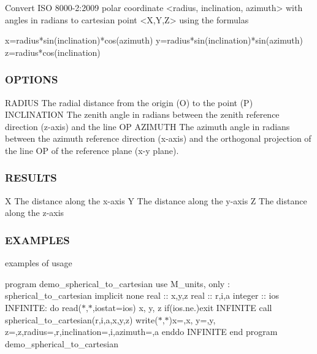 \begin{DoxyVerb} Convert ISO 8000-2:2009 polar coordinate <radius, inclination, azimuth> with
 angles in radians to cartesian point <X,Y,Z> using the formulas

   x=radius*sin(inclination)*cos(azimuth)
   y=radius*sin(inclination)*sin(azimuth)
   z=radius*cos(inclination)
\end{DoxyVerb}


\subsubsection*{O\+P\+T\+I\+O\+NS}

\begin{DoxyVerb}RADIUS       The radial distance from the origin (O) to the point (P)
INCLINATION  The zenith angle in radians between the zenith reference direction
             (z-axis) and the line OP
AZIMUTH      The azimuth angle in radians between the azimuth reference direction
             (x-axis) and the orthogonal projection of the line OP of the
             reference plane (x-y plane).
\end{DoxyVerb}


\subsubsection*{R\+E\+S\+U\+L\+TS}

\begin{DoxyVerb}X  The distance along the x-axis
Y  The distance along the y-axis
Z  The distance along the z-axis
\end{DoxyVerb}


\subsubsection*{E\+X\+A\+M\+P\+L\+ES}

examples of usage

program demo\+\_\+spherical\+\_\+to\+\_\+cartesian use M\+\_\+units, only \+: spherical\+\_\+to\+\_\+cartesian implicit none real \+:\+: x,y,z real \+:\+: r,i,a integer \+:\+: ios I\+N\+F\+I\+N\+I\+TE\+: do read($\ast$,$\ast$,iostat=ios) x, y, z if(ios.\+ne.)exit I\+N\+F\+I\+N\+I\+TE call spherical\+\_\+to\+\_\+cartesian(r,i,a,x,y,z) write($\ast$,$\ast$)\textquotesingle{}x=\textquotesingle{},x,\textquotesingle{} y=\textquotesingle{},y,\textquotesingle{} z=\textquotesingle{},z,\textquotesingle{}radius=\textquotesingle{},r,\textquotesingle{}inclination=\textquotesingle{},i,\textquotesingle{}azimuth=\textquotesingle{},a enddo I\+N\+F\+I\+N\+I\+TE end program demo\+\_\+spherical\+\_\+to\+\_\+cartesian \mbox{\label{namespacem__units_ad6861fff0b83942a7e6b35a274bf2e09}} 

